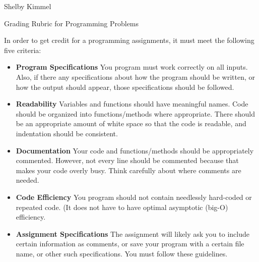 \documentclass[11pt,landscape]{article}
\begin{document}
\hfill Shelby Kimmel

\begin{center}
{\huge Grading Rubric for Programming Problems}
\end{center}
\bigskip

In order to get credit for a programming assignments, it must meet the following five criteria:

\begin{itemize}
\item \textbf{Program Specifications} You program must work correctly on all inputs. Also, if there any specifications about how the program should be written, or how the output should appear, those specifications should be followed.

\item \textbf{Readability} Variables and functions should have meaningful names. Code should be organized into functions/methods where appropriate. There should be an appropriate amount of white space so that the code is readable, and indentation should be consistent.

\item \textbf{Documentation} Your code and functions/methods should be appropriately commented. However, not every line should be commented because that makes your code overly busy. Think carefully about where comments are needed. 

\item \textbf{Code Efficiency} You program should not contain needlessly hard-coded or repeated code. (It does not have to have optimal asymptotic (big-O) efficiency.

\item \textbf{Assignment Specifications} The assignment will likely ask you to include certain information as comments, or save your program with a certain file name, or other such specifications. You must follow these guidelines.
\end{itemize}
\end{document}
